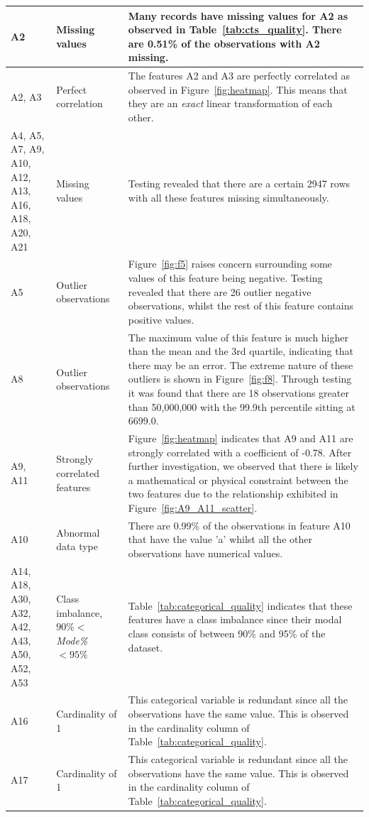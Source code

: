 \documentclass[11pt]{article}
\begin{document}
\begin{longtable}{|p{1.7cm}|p{4cm}|p{8cm}|}
	A2 & Missing values & Many records have missing values for A2 as observed in Table~\ref{tab:cts_quality}. There are 0.51\% of the observations with A2 missing. \\
	\hline
	A2, A3 & Perfect correlation & The features A2 and A3 are perfectly correlated as observed in Figure~\ref{fig:heatmap}. This means that they are an \textit{exact} linear transformation of each other.\\
	\hline
	A4, A5, A7, A9, A10, A12, A13, A16, A18, A20, A21 & Missing values & Testing revealed that there are a certain 2947 rows with all these features missing simultaneously. \\
	\hline
	A5 & Outlier observations & Figure~\ref{fig:f5} raises concern surrounding some values of this feature being negative. Testing revealed that there are 26 outlier negative observations, whilst the rest of this feature contains positive values. \\
	\hline
	A8 & Outlier observations & The maximum value of this feature is much higher than the mean and the 3rd quartile, indicating that there may be an error. The extreme nature of these outliers is shown in Figure~\ref{fig:f8}. Through testing it was found that there are 18 observations greater than 50,000,000 with the 99.9th percentile sitting at 6699.0.\\
	\hline
	A9, A11 & Strongly correlated features & Figure~\ref{fig:heatmap} indicates that A9 and A11 are strongly correlated with a coefficient of  -0.78. After further investigation, we observed that there is likely a mathematical or physical constraint between the two features due to the relationship exhibited in Figure~\ref{fig:A9_A11_scatter}.\\
	\hline
	A10 & Abnormal data type & There are 0.99\% of the observations in feature A10 that have the value 'a' whilst all the other observations have numerical values. \\
	\hline
	A14, A18, A30, A32, A42, A43, A50, A52, A53 & Class imbalance, $90\%<$\textit{Mode\%} $< 95\%$ & Table~\ref{tab:categorical_quality} indicates that these features have a class imbalance since their modal class consists of between 90\% and 95\% of the dataset. \\
	\hline
	A16 & Cardinality of 1 & This categorical variable is redundant since all the observations have the same value. This is observed in the cardinality column of Table~\ref{tab:categorical_quality}. \\
	\hline
	A17 & Cardinality of 1 & This categorical variable is redundant since all the observations have the same value. This is observed in the cardinality column of Table~\ref{tab:categorical_quality}. \\

\end{longtable}
\end{document}
